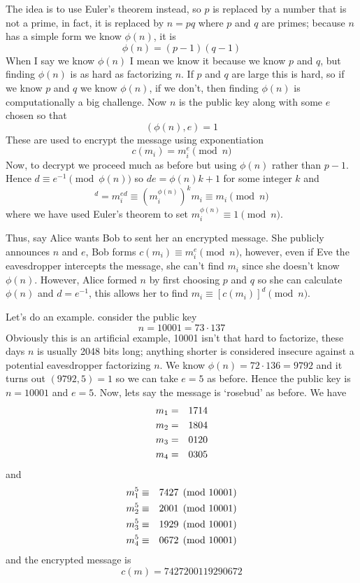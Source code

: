 \documentclass[12pt]{article}
\begin{document}
The idea is to use Euler's theorem instead, so $p$ is replaced by a
number that is not a prime, in fact, it is replaced by $n=pq$ where
$p$ and $q$ are primes; because $n$ has a simple form we know $\phi(n)$, it is
\begin{equation}
\phi(n)=(p-1)(q-1)
\end{equation}
When I say we know $\phi(n)$ I mean we know it because we know $p$ and
$q$, but finding $\phi(n)$ is as hard as factorizing $n$. If $p$ and
$q$ are large this is hard, so if we know $p$ and $q$ we know
$\phi(n)$, if we don't, then finding $\phi(n)$ is computationally a
big challenge. Now $n$ is the public key along with some $e$ chosen so that 
\begin{equation}
(\phi(n),e)=1
\end{equation}
These are used to encrypt the message using exponentiation
\begin{equation}
c(m_i)=m_i^e\pmod{n}
\end{equation}
Now, to decrypt we proceed much as before but using $\phi(n)$ rather than $p-1$. Hence $d\equiv e^{-1}\pmod{\phi(n)}$ so $de=\phi(n)k+1$ for some integer $k$ and
\begin{equation}
[c(m_i)]^d=m_i^{ed}\equiv \left(m_i^{\phi(n)}\right)^km_i\equiv m_i\pmod{n}
\end{equation}
where we have used Euler's theorem to set $m_i^{\phi(n)}\equiv 1\pmod{n}$.

Thus, say Alice wants Bob to sent her an encrypted message. She
publicly announces $n$ and $e$, Bob forms $c(m_i)\equiv
m_i^e\pmod{n}$, however, even if Eve the eavesdropper intercepts the
message, she can't find $m_i$ since she doesn't know
$\phi(n)$. However, Alice formed $n$ by first choosing $p$ and $q$ so
she can calculate $\phi(n)$ and $d=e^{-1}$, this allows her to find
$m_i\equiv [c(m_i)]^d\pmod{n}$.

Let's do an example. consider the public key 
\begin{equation}
n=10001=73\cdot 137
\end{equation}
Obviously this is an artificial example, 10001 isn't that hard to
factorize, these days $n$ is usually 2048 bits long; anything shorter
is considered insecure against a potential eavesdropper factorizing
$n$. We know $\phi(n)=72\cdot 136=9792$ and it turns out $(9792,5)=1$ so we can take $e=5$ as before. Hence the public key is $n=10001$ and $e=5$. Now, lets say the message is \lq{}rosebud\rq{} as before. We have
\begin{eqnarray}
m_1&=&1714\cr
m_2&=&1804\cr
m_3&=&0120\cr
m_4&=&0305
\end{eqnarray}
and
\begin{eqnarray}
m_1^5&\equiv&7427\pmod{10001}\cr
m_2^5&\equiv&2001\pmod{10001}\cr
m_3^5&\equiv&1929\pmod{10001}\cr
m_4^5&\equiv&0672\pmod{10001}
\end{eqnarray}
and the encrypted message is
\begin{equation}
c(m)=7427200119290672
\end{equation}
\end{document}
